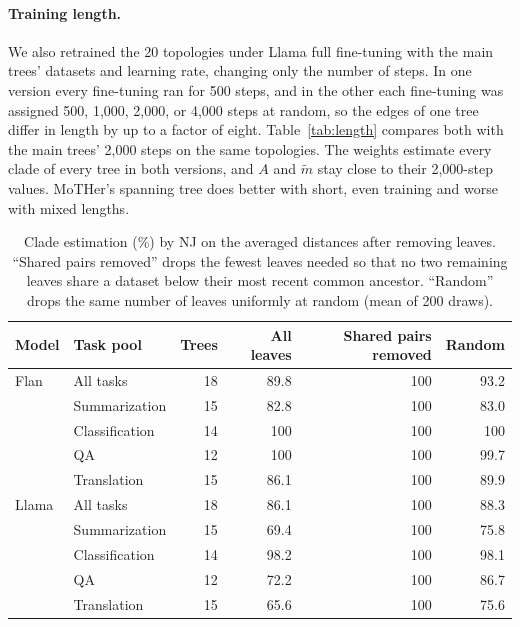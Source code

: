 \documentclass{article}
\theoremstyle{definition}
\theoremstyle{plain}
\newif\ifrevision
\newcommand{\rev}[1]{\ifrevision{\color{blue}#1}\else#1\fi}
\newcommand{\revcolor}{\ifrevision\color{blue}\fi}
\newcommand{\revtag}[1]{\ifrevision\textsuperscript{\color{blue}\sffamily\scriptsize[#1]}\fi}
\begin{document}
{\paragraph{Training length.}\revtag{S8sV Q2; tWEn W2} We also retrained the 20 topologies under Llama full fine-tuning with the main trees' datasets and learning rate, changing only the number of steps. In one version every fine-tuning ran for 500 steps, and in the other each fine-tuning was assigned 500, 1,000, 2,000, or 4,000 steps at random, so the edges of one tree differ in length by up to a factor of eight. Table~\ref{tab:length} compares both with the main trees' 2,000 steps on the same topologies. The weights estimate every clade of every tree in both versions, and $A$ and $\widetilde m$ stay close to their 2,000-step values. MoTHer's spanning tree does better with short, even training and worse with mixed lengths.
}


\begin{table}[h]
{\revcolor
\caption{\rev{Clade estimation (\%) by NJ on the averaged distances after removing leaves. ``Shared pairs removed'' drops the fewest leaves needed so that no two remaining leaves share a dataset below their most recent common ancestor. ``Random'' drops the same number of leaves uniformly at random (mean of 200 draws).}\revtag{tWEn W1, W2; S8sV Q2}}
\label{tab:prune}
\centering
\small
\begin{tabular}{llrrrr}
\toprule
Model & Task pool & Trees & All leaves & Shared pairs removed & Random \\
\midrule
Flan & All tasks & 18 & 89.8 & 100 & 93.2 \\
 & Summarization & 15 & 82.8 & 100 & 83.0 \\
 & Classification & 14 & 100 & 100 & 100 \\
 & QA & 12 & 100 & 100 & 99.7 \\
 & Translation & 15 & 86.1 & 100 & 89.9 \\
\midrule
Llama & All tasks & 18 & 86.1 & 100 & 88.3 \\
 & Summarization & 15 & 69.4 & 100 & 75.8 \\
 & Classification & 14 & 98.2 & 100 & 98.1 \\
 & QA & 12 & 72.2 & 100 & 86.7 \\
 & Translation & 15 & 65.6 & 100 & 75.6 \\
\bottomrule
\end{tabular}\par
}
\end{table}
\end{document}
